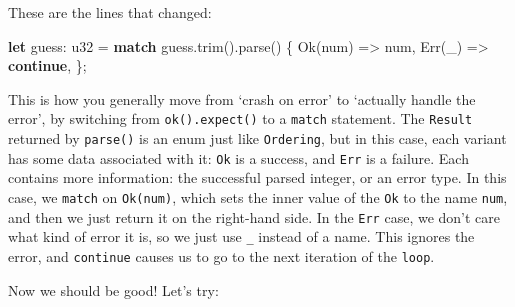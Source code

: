\documentclass[a4paper,]{book}
\newenvironment{Shaded}{\begin{snugshade}}{\end{snugshade}}
\newcommand{\KeywordTok}[1]{\textcolor[rgb]{0.13,0.29,0.53}{\textbf{{#1}}}}
\newcommand{\DataTypeTok}[1]{\textcolor[rgb]{0.13,0.29,0.53}{{#1}}}
\newcommand{\ConstantTok}[1]{\textcolor[rgb]{0.00,0.00,0.00}{{#1}}}
\newcommand{\NormalTok}[1]{{#1}}
\begin{document}
These are the lines that changed:

\begin{Shaded}
\begin{Highlighting}[]
\KeywordTok{let} \NormalTok{guess: }\DataTypeTok{u32} \NormalTok{= }\KeywordTok{match} \NormalTok{guess.trim().parse() \{}
    \ConstantTok{Ok}\NormalTok{(num) => num,}
    \ConstantTok{Err}\NormalTok{(_) => }\KeywordTok{continue}\NormalTok{,}
\NormalTok{\};}
\end{Highlighting}
\end{Shaded}

This is how you generally move from `crash on error' to `actually handle
the error', by switching from \texttt{ok().expect()} to a \texttt{match}
statement. The \texttt{Result} returned by \texttt{parse()} is an enum
just like \texttt{Ordering}, but in this case, each variant has some
data associated with it: \texttt{Ok} is a success, and \texttt{Err} is a
failure. Each contains more information: the successful parsed integer,
or an error type. In this case, we \texttt{match} on \texttt{Ok(num)},
which sets the inner value of the \texttt{Ok} to the name \texttt{num},
and then we just return it on the right-hand side. In the \texttt{Err}
case, we don't care what kind of error it is, so we just use \texttt{\_}
instead of a name. This ignores the error, and \texttt{continue} causes
us to go to the next iteration of the \texttt{loop}.

Now we should be good! Let's try:

\begin{Shaded}
\end{Shaded}
\end{document}

